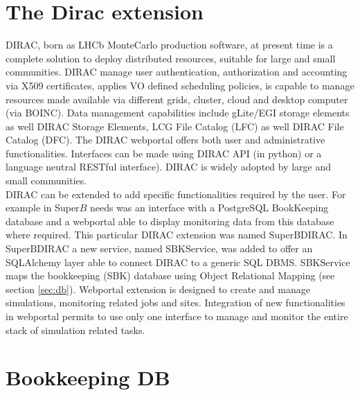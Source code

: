 \documentclass[a4paper]{jpconf}
\begin{document}
 
\section{The Dirac extension} 
DIRAC, born as LHCb MonteCarlo production software, at present time is a complete solution to deploy distributed resources, suitable for large and small communities. DIRAC manage user authentication, authorization and accounting via X509 certificates, applies VO defined scheduling policies, is capable to manage resources made available via different grids, cluster, cloud and desktop computer (via BOINC). Data management capabilities include gLite/EGI storage elements as well DIRAC Storage Elements, LCG File Catalog (LFC) as well DIRAC File Catalog (DFC). The DIRAC webportal offers both user and administrative functionalities. Interfaces can be made using DIRAC API (in python) or a language neutral RESTful interface). DIRAC is widely adopted by large and small communities.\\
DIRAC can be extended to add specific functionalities required by the user. For example in Super$B$\cite{ref:superb_tdr} needs was an interface with a PostgreSQL BookKeeping database and a webportal able to display monitoring data from this database where required. This particular DIRAC extension was named SuperBDIRAC.
In SuperBDIRAC a new service, named SBKService, was added to offer an SQLAlchemy layer able to connect DIRAC to a generic SQL DBMS. SBKService maps the bookkeeping (SBK) database using Object Relational Mapping (see section \ref{sec:db}). 
Webportal extension is designed to create and manage simulations, monitoring related jobs and sites. Integration of new functionalities in webportal permits to use only one interface to manage and monitor the entire stack of simulation related tasks.

\section{Bookkeeping DB}
\label{sec:sbk}
\end{document}
